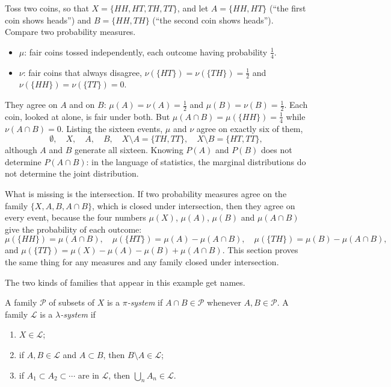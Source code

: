 \begin{notechapter}
\begin{example}\label{measures:ex:coins}
Toss two coins, so that $X = \{HH, HT, TH, TT\}$, and let
$A = \{HH, HT\}$ (``the first coin shows heads'') and
$B = \{HH, TH\}$ (``the second coin shows heads''). Compare two
probability measures.
\begin{itemize}[nosep]
  \item $\mu$: fair coins tossed independently, each outcome having
        probability $\frac14$.
  \item $\nu$: fair coins that always disagree,
        $\nu(\{HT\}) = \nu(\{TH\}) = \frac12$ and
        $\nu(\{HH\}) = \nu(\{TT\}) = 0$.
\end{itemize}
They agree on $A$ and on $B$: $\mu(A) = \nu(A) = \frac12$ and
$\mu(B) = \nu(B) = \frac12$. Each coin, looked at alone, is fair under
both. But $\mu(A\cap B) = \mu(\{HH\}) = \frac14$ while
$\nu(A\cap B) = 0$. Listing the sixteen events, $\mu$ and $\nu$ agree
on exactly six of them,
\[
  \emptyset,\quad X,\quad A,\quad B,\quad
  X\setminus A = \{TH, TT\},\quad X\setminus B = \{HT, TT\},
\]
although $A$ and $B$ generate all sixteen. Knowing $P(A)$ and $P(B)$
does not determine $P(A\cap B)$: in the language of statistics, the
marginal distributions do not determine the joint distribution.

What is missing is the intersection. If two probability measures agree
on the family $\{X, A, B, A\cap B\}$, which is closed under
intersection, then they agree on every event, because the four numbers
$\mu(X)$, $\mu(A)$, $\mu(B)$ and $\mu(A\cap B)$ give the probability of
each outcome:
\[
  \mu(\{HH\}) = \mu(A\cap B),\quad
  \mu(\{HT\}) = \mu(A) - \mu(A\cap B),\quad
  \mu(\{TH\}) = \mu(B) - \mu(A\cap B),
\]
and $\mu(\{TT\}) = \mu(X) - \mu(A) - \mu(B) + \mu(A\cap B)$. This
section proves the same thing for any measures and any family closed
under intersection.
\end{example}

The two kinds of families that appear in this example get names.

\begin{definition}\label{measures:def:pilambda}
A family $\mathcal P$ of subsets of $X$ is a \emph{$\pi$-system} if
$A\cap B\in\mathcal P$ whenever $A, B\in\mathcal P$. A family
$\mathcal L$ is a \emph{$\lambda$-system} if
\begin{enumerate}[nosep]
  \item $X\in\mathcal L$;
  \item if $A, B\in\mathcal L$ and $A\subset B$, then
        $B\setminus A\in\mathcal L$;
  \item if $A_1\subset A_2\subset\cdots$ are in $\mathcal L$, then
        $\bigcup_nA_n\in\mathcal L$.
\end{enumerate}
\end{definition}


\end{notechapter}
